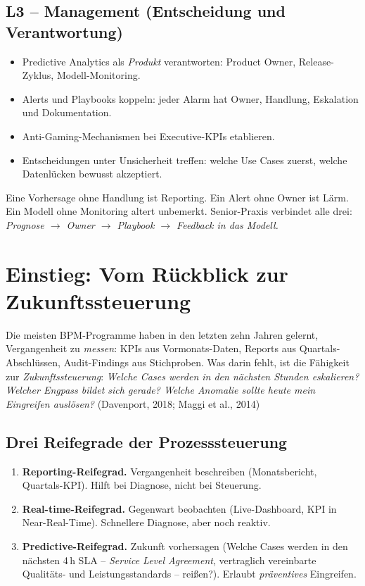 \documentclass[11pt,a4paper,oneside]{article}
\newcommand{\fachbegriff}[1]{\textbf{#1}}
\newcommand{\quelle}[1]{{\footnotesize\color{lpGray}(#1)}}
\begin{document}
\subsection*{L3 -- Management (Entscheidung und Verantwortung)}
\begin{itemize}
  \item Predictive Analytics als \emph{Produkt} verantworten: Product Owner, Release-Zyklus, Modell-Monitoring.
  \item Alerts und Playbooks koppeln: jeder Alarm hat Owner, Handlung, Eskalation und Dokumentation.
  \item Anti-Gaming-Mechanismen bei Executive-KPIs etablieren.
  \item Entscheidungen unter Unsicherheit treffen: welche Use Cases zuerst, welche Datenlücken bewusst akzeptiert.
\end{itemize}

\begin{merkbox}
Eine Vorhersage ohne Handlung ist Reporting. Ein Alert ohne Owner ist Lärm. Ein Modell ohne Monitoring altert unbemerkt. Senior-Praxis verbindet alle drei: \emph{Prognose $\rightarrow$ Owner $\rightarrow$ Playbook $\rightarrow$ Feedback in das Modell.}
\end{merkbox}

\clearpage

\section{Einstieg: Vom Rückblick zur Zukunftssteuerung}

Die meisten BPM-Programme haben in den letzten zehn Jahren gelernt, Vergangenheit zu \emph{messen}: KPIs aus Vormonats-Daten, Reports aus Quartals-Abschlüssen, Audit-Findings aus Stichproben. Was darin fehlt, ist die Fähigkeit zur \emph{Zukunftssteuerung}: \emph{Welche Cases werden in den nächsten Stunden eskalieren? Welcher Engpass bildet sich gerade? Welche Anomalie sollte heute mein Eingreifen auslösen?} \quelle{Davenport, 2018; Maggi et al., 2014}

\subsection{Drei Reifegrade der Prozesssteuerung}

\begin{enumerate}
  \item \fachbegriff{Reporting-Reifegrad.} Vergangenheit beschreiben (Monatsbericht, Quartals-KPI). Hilft bei Diagnose, nicht bei Steuerung.
  \item \fachbegriff{Real-time-Reifegrad.} Gegenwart beobachten (Live-Dashboard, KPI in Near-Real-Time). Schnellere Diagnose, aber noch reaktiv.
  \item \fachbegriff{Predictive-Reifegrad.} Zukunft vorhersagen (Welche Cases werden in den nächsten 4\,h SLA -- \emph{Service Level Agreement}, vertraglich vereinbarte Qualitäts- und Leistungsstandards -- reißen?). Erlaubt \emph{präventives} Eingreifen.
\end{enumerate}
\end{document}
